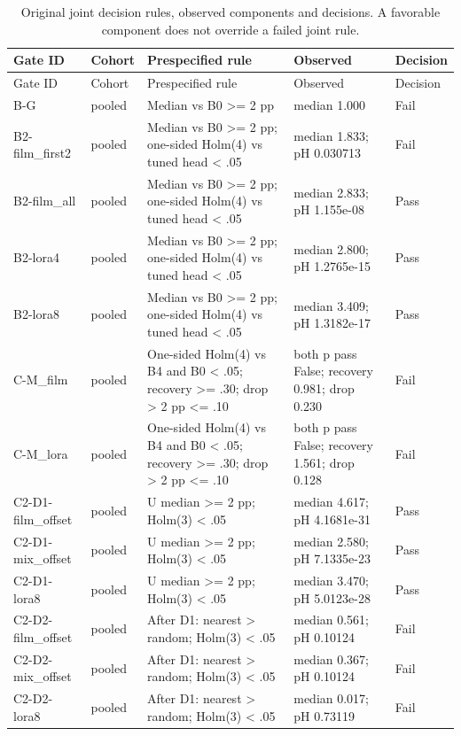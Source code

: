 \begin{longtable}{p{1.75in}p{.55in}p{2.15in}p{1.65in}p{.5in}}
\caption{Original joint decision rules, observed components and decisions. A favorable component does not override a failed joint rule.}\label{tab:gates}\\
\toprule
Gate ID & Cohort & Prespecified rule & Observed & Decision \\
\midrule
\endfirsthead
\toprule
Gate ID & Cohort & Prespecified rule & Observed & Decision \\
\midrule
\endhead
B-G & pooled & Median vs B0 >= 2 pp & median 1.000 & Fail \\
B2-film\_\allowbreak{}first2 & pooled & Median vs B0 >= 2 pp; one-sided Holm(4) vs tuned head < .05 & median 1.833; pH 0.030713 & Fail \\
B2-film\_\allowbreak{}all & pooled & Median vs B0 >= 2 pp; one-sided Holm(4) vs tuned head < .05 & median 2.833; pH 1.155e-08 & Pass \\
B2-lora4 & pooled & Median vs B0 >= 2 pp; one-sided Holm(4) vs tuned head < .05 & median 2.800; pH 1.2765e-15 & Pass \\
B2-lora8 & pooled & Median vs B0 >= 2 pp; one-sided Holm(4) vs tuned head < .05 & median 3.409; pH 1.3182e-17 & Pass \\
C-M\_\allowbreak{}film & pooled & One-sided Holm(4) vs B4 and B0 < .05; recovery >= .30; drop > 2 pp <= .10 & both p pass False; recovery 0.981; drop 0.230 & Fail \\
C-M\_\allowbreak{}lora & pooled & One-sided Holm(4) vs B4 and B0 < .05; recovery >= .30; drop > 2 pp <= .10 & both p pass False; recovery 1.561; drop 0.128 & Fail \\
C2-D1-film\_\allowbreak{}offset & pooled & U median >= 2 pp; Holm(3) < .05 & median 4.617; pH 4.1681e-31 & Pass \\
C2-D1-mix\_\allowbreak{}offset & pooled & U median >= 2 pp; Holm(3) < .05 & median 2.580; pH 7.1335e-23 & Pass \\
C2-D1-lora8 & pooled & U median >= 2 pp; Holm(3) < .05 & median 3.470; pH 5.0123e-28 & Pass \\
C2-D2-film\_\allowbreak{}offset & pooled & After D1: nearest > random; Holm(3) < .05 & median 0.561; pH 0.10124 & Fail \\
C2-D2-mix\_\allowbreak{}offset & pooled & After D1: nearest > random; Holm(3) < .05 & median 0.367; pH 0.10124 & Fail \\
C2-D2-lora8 & pooled & After D1: nearest > random; Holm(3) < .05 & median 0.017; pH 0.73119 & Fail \\

\end{longtable}
